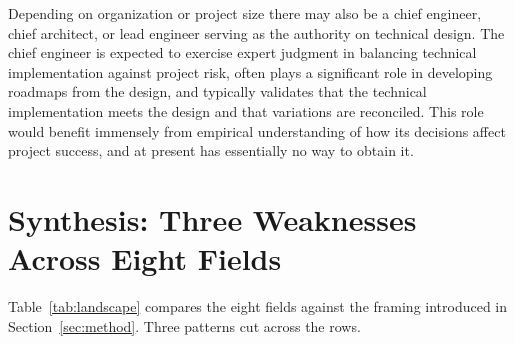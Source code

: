 \documentclass{csimq}
\begin{document}
Depending on organization or project size there may also be a chief engineer,
chief architect, or lead engineer serving as the authority on technical design.
The chief engineer is expected to exercise expert judgment in balancing
technical implementation against project risk, often plays a significant role in
developing roadmaps from the design, and typically validates that the technical
implementation meets the design and that variations are reconciled. This role
would benefit immensely from empirical understanding of how its decisions affect
project success, and at present has essentially no way to obtain it.

\section{Synthesis: Three Weaknesses Across Eight Fields}
\label{sec:synthesis}

Table~\ref{tab:landscape} compares the eight fields against the
framing introduced in Section~\ref{sec:method}. Three patterns cut across the rows.
\end{document}
